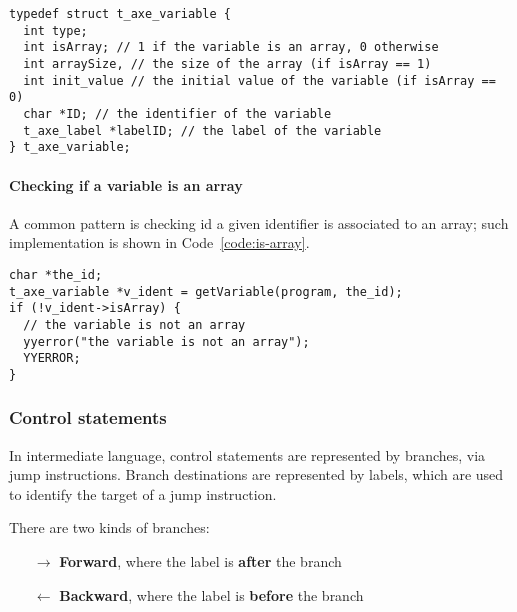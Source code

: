 \documentclass[english]{article}
\begin{document}
\begin{onepage}
  \begin{lstlisting}[language=LANCE, caption={Variable structure}, label={code:variable-structure}]
typedef struct t_axe_variable {
  int type;
  int isArray; // 1 if the variable is an array, 0 otherwise
  int arraySize, // the size of the array (if isArray == 1)
  int init_value // the initial value of the variable (if isArray == 0)
  char *ID; // the identifier of the variable
  t_axe_label *labelID; // the label of the variable
} t_axe_variable;
\end{lstlisting}
\end{onepage}

\paragraph{Checking if a variable is an array}

A common pattern is checking id a given identifier is associated to an array;
such implementation is shown in Code~\ref{code:is-array}.

\begin{onepage}
  \begin{lstlisting}[language=LANCE, caption={Checking if a variable is an array}, label={code:is-array}]
char *the_id;
t_axe_variable *v_ident = getVariable(program, the_id);
if (!v_ident->isArray) {
  // the variable is not an array
  yyerror("the variable is not an array");
  YYERROR;
}
\end{lstlisting}
\end{onepage}

\subsubsection{Control statements}

In intermediate language, control statements are represented by branches, via jump instructions.
Branch destinations are represented by labels, which are used to identify the target of a jump instruction.

There are two kinds of branches:

\begin{itemize}
  \item[\(\rightarrow\)] \textbf{Forward}, where the label is \textbf{after} the branch
  \item[\(\leftarrow\)] \textbf{Backward}, where the label is \textbf{before} the branch
\end{itemize}
\end{document}
